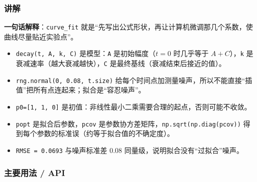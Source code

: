 \begin{Shaded}
\begin{Highlighting}[]
\end{Highlighting}
\end{Shaded}

\subsubsection{讲解}\label{ux8bb2ux89e3-15}

\textbf{一句话解释}：\texttt{curve\_fit}
就是``先写出公式形状，再让计算机微调那几个系数，使曲线尽量贴近实验点''。

\begin{itemize}
\tightlist
\item
  \texttt{decay(t,\ A,\ k,\ C)} 是模型：\texttt{A} 是初始幅度（\(t=0\)
  时几乎等于 \(A+C\)），\texttt{k}
  是衰减速率（越大衰减越快），\texttt{C}
  是最终基线（衰减结束后接近的值）。
\item
  \texttt{rng.normal(0,\ 0.08,\ t.size)}
  给每个时间点加测量噪声，所以不能直接``插值''把所有点连起来；拟合是``容忍噪声''。
\item
  \texttt{p0={[}1,\ 1,\ 0{]}}
  是初值：非线性最小二乘需要合理的起点，否则可能不收敛。
\item
  \texttt{popt} 是拟合后参数，\texttt{pcov}
  是参数协方差矩阵，\texttt{np.sqrt(np.diag(pcov))}
  得到每个参数的标准误（约等于拟合值的不确定度）。
\item
  \texttt{RMSE\ =\ 0.0693} 与噪声标准差 0.08
  同量级，说明拟合没有``过拟合''噪声。
\end{itemize}

\subsubsection{主要用法 / API}\label{ux4e3bux8981ux7528ux6cd5-api-15}

